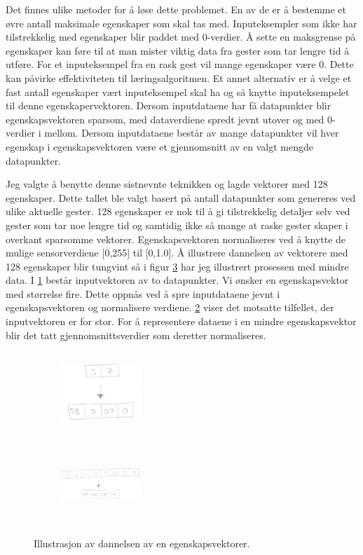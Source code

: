 Det finnes ulike metoder for å løse dette problemet. En av de er å bestemme et øvre antall maksimale egenskaper som skal tas med. Inputeksempler som ikke har tilstrekkelig med egenskaper blir paddet med 0-verdier. Å sette en maksgrense på egenskaper kan føre til at man mister viktig data fra gester som tar lengre tid å utføre. For et inputeksempel fra en rask gest vil mange egenskaper være 0. Dette kan påvirke effektiviteten til læringsalgoritmen. Et annet alternativ er å velge et fast antall egenskaper vært inputeksempel skal ha og så knytte inputeksempelet til denne egenskapervektoren. Dersom inputdataene har få datapunkter blir egenskapsvektoren sparsom, med dataverdiene spredt jevnt utover og med 0-verdier i mellom. Dersom inputdataene består av mange datapunkter vil hver egenskap i egenskapsvektoren være et gjennomsnitt av en valgt mengde datapunkter.

Jeg valgte å benytte denne sistnevnte teknikken og lagde vektorer med 128 egenskaper. Dette tallet ble valgt basert på antall datapunkter som genereres ved ulike aktuelle gester. 128 egenskaper er nok til å gi tilstrekkelig detaljer selv ved gester som tar noe lengre tid og samtidig ikke så mange at raske gester skaper i overkant sparsomme vektorer. Egenskapsvektoren normaliseres ved å knytte de mulige sensorverdiene [0,255] til [0,1.0]. Å illustrere dannelsen av vektorere med 128 egenskaper blir tungvint så i figur \ref{fig:data} har jeg illustrert prosessen med mindre data. I \ref{fig:few} består inputvektoren av to datapunkter. Vi ønsker en egenskapsvektor med størrelse fire. Dette oppnås ved å spre inputdataene jevnt i egenskapsvektoren og normalisere verdiene. \ref{fig:many} viser det motsatte tilfellet, der inputvektoren er for stor. For å representere dataene i en mindre egenskapsvektor blir det tatt gjennomsnittsverdier som deretter normaliseres. 

\begin{figure}[h]
\centering
\begin{subfigure}{0.23\textwidth}
\includegraphics[width=3cm, height=3cm]{fig/few-to-many}
\caption{}
\label{fig:few}
\end{subfigure}
\begin{subfigure}{0.23\textwidth}
\includegraphics[width=3cm, height=3cm]{fig/many-to-few}
\caption{}
\label{fig:many}
\end{subfigure}
\caption{Illustrasjon av dannelsen av en egenskapsvektorer.}
\label{fig:data}
\end{figure}

